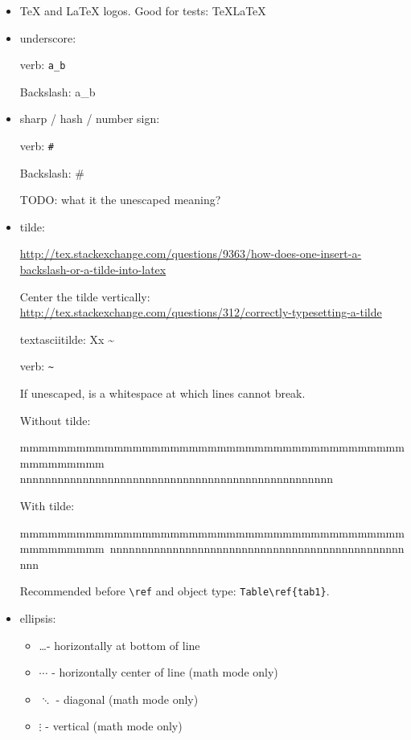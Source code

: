 \documentclass[12pt]{article}
\begin{document}
  \begin{itemize}

    \item TeX and LaTeX logos. Good for tests: \TeX \LaTeX

    \item underscore:

      verb: \verb|a_b|

      Backslash: a\_b

    \item sharp / hash / number sign:

      verb: \verb|#|

      Backslash: \#

      TODO: what it the unescaped meaning?

    \item tilde:

      \url{http://tex.stackexchange.com/questions/9363/how-does-one-insert-a-backslash-or-a-tilde-into-latex}

      Center the tilde vertically: \url{http://tex.stackexchange.com/questions/312/correctly-typesetting-a-tilde}

      textasciitilde: Xx \textasciitilde

      verb: \verb|~|

      If unescaped, is a whitespace at which lines cannot break.

      Without tilde:

      mmmmmmmmmmmmmmmmmmmmmmmmmmmmmmmmmmmmmmmmmmmmmmmmmm nnnnnnnnnnnnnnnnnnnnnnnnnnnnnnnnnnnnnnnnnnnnnnnnnn 

      With tilde:

      mmmmmmmmmmmmmmmmmmmmmmmmmmmmmmmmmmmmmmmmmmmmmmmmmm~nnnnnnnnnnnnnnnnnnnnnnnnnnnnnnnnnnnnnnnnnnnnnnnnnn 

      Recommended before \lstinline|\ref| and object type: \lstinline|Table\ref{tab1}|.

    \item ellipsis:
    \begin{itemize}
      \item  \ldots   - horizontally at bottom of line
      \item  $\cdots$ - horizontally center of line (math mode only)
      \item  $\ddots$ - diagonal (math mode only)
      \item  $\vdots$ - vertical (math mode only)
    \end{itemize}


\end{itemize}
\end{document}
